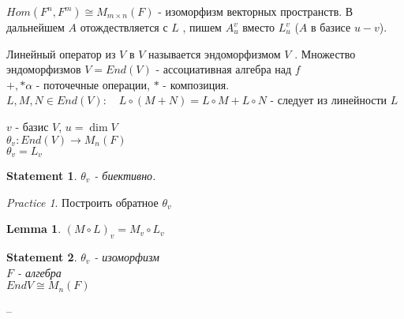 \documentclass[11pt]{book}
\theoremstyle{definition}
\theoremstyle{plain}
\theoremstyle{plain}
\newtheorem*{lm}{Lemma}
\newtheorem*{st}{Statement}
\theoremstyle{definition}
\theoremstyle{remark}
\newtheorem*{prac}{Practice}
\begin{document}
$Hom (F^n , F^m ) \cong M_{m\times n} (F)$ - изоморфизм векторных пространств.
В дальнейшем $A$ отождествляется с $L$ , пишем $A_u ^v $ вместо $L_u ^v$ ($A$ в базисе $u-v$). 
\begin{defn}
Линейный оператор  из $V $ в  $V$ называется эндоморфизмом $V$ .
Множество эндоморфизмов $V = End(V)$ - ассоциативная алгебра над $f$\\
$+, *\alpha$ - поточечные операции, $*$ - композиция.\\
$L, M, N \in End(V): \quad L\circ (M + N) = L \circ M + L \circ N$ - следует из линейности  $L$
\end{defn}
$v$  - базис $V$, $u = \dim V$ \\
$\theta _v : End(V) \to M_n (F)$ \\
$\theta _v = L_v$
\begin{st}
    $\theta_v$ -  биективно.
\end{st}
\begin{prac}
    Построить обратное $\theta_v$
\end{prac}

\begin{lm}
    $(M \circ L)_v = M_v \circ L_v$
\end{lm}
 \begin{st}
     $\theta _v$ - изоморфизм \\ $F$ - алгебра \\ $End V \cong M_n(F)$
\end{st}

--
\end{document}
